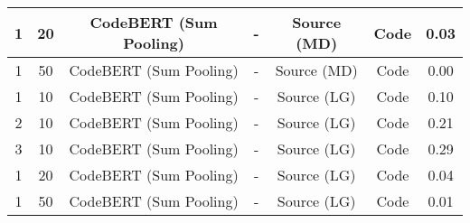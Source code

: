 \begin{longtable}{|c|c|c|c|c|c|c|}
\hline
1 & 20 & CodeBERT (Sum Pooling) & - & Source (MD) & Code & 0.03 \\
\hline
1 & 50 & CodeBERT (Sum Pooling) & - & Source (MD) & Code & 0.00 \\
\hline
1 & 10 & CodeBERT (Sum Pooling) & - & Source (LG) & Code & 0.10 \\
\hline
2 & 10 & CodeBERT (Sum Pooling) & - & Source (LG) & Code & 0.21 \\
\hline
3 & 10 & CodeBERT (Sum Pooling) & - & Source (LG) & Code & 0.29 \\
\hline
1 & 20 & CodeBERT (Sum Pooling) & - & Source (LG) & Code & 0.04 \\
\hline
1 & 50 & CodeBERT (Sum Pooling) & - & Source (LG) & Code & 0.01 \\
\hline
\end{longtable}
